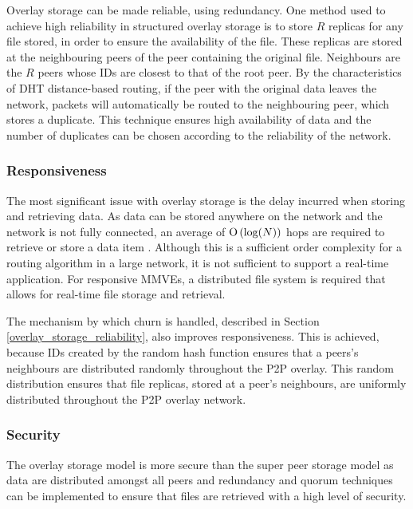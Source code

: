 Overlay storage can be made reliable, using redundancy. One method used to achieve high reliability in structured overlay storage is to store $R$ replicas for any file stored, in order to ensure the availability of the file. These replicas are stored at the neighbouring peers of the peer containing the original file. Neighbours are the $R$ peers whose IDs are closest to that of the root peer. By the characteristics of DHT distance-based routing, if the peer with the original data leaves the network, packets will automatically be routed to the neighbouring peer, which stores a duplicate. This technique ensures high availability of data and the number of duplicates can be chosen according to the reliability of the
network.


\subsubsection{Responsiveness}

The most significant issue with overlay storage is the delay incurred when storing and retrieving data. As data can be stored anywhere on the network and the network is not fully connected, an average of $\operatorname{O}\left(\log(N)\right)$ hops are required to retrieve or store a data item \cite{storage_and_chaching_PAST}. Although this is a sufficient order complexity for a routing algorithm in a large network, it is not sufficient to support a real-time application. For responsive MMVEs, a distributed file system is required that allows for real-time file storage and retrieval.

The mechanism by which churn is handled, described in Section \ref{overlay_storage_reliability}, also improves responsiveness.  This is achieved, because IDs created by the random hash function ensures that a peers's neighbours are distributed randomly throughout the P2P overlay. This random distribution ensures that file replicas, stored at a peer's neighbours, are uniformly distributed throughout the P2P overlay network.


\subsubsection{Security}
The overlay storage model is more secure than the super peer storage model as data are distributed amongst all peers and redundancy and quorum techniques can be implemented to ensure that files are retrieved with a high level of security.

